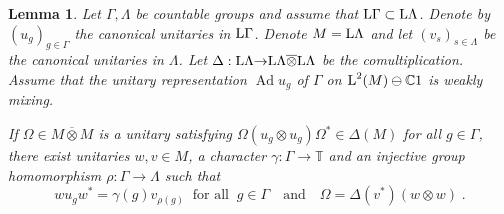 \documentclass[a4paper,11pt]{amsart}
\numberwithin{equation}{section}
\newtheorem{lemma}[definition]{Lemma}
\begin{document}
\begin{lemma} \label{lem.intertwine}
Let $\Gamma,\Lambda$ be countable groups and assume that ${\mathord{\text{\rm L}}} \Gamma \subset {\mathord{\text{\rm L}}} \Lambda$. Denote by $(u_g)_{g \in \Gamma}$ the canonical unitaries in ${\mathord{\text{\rm L}}} \Gamma$. Denote $M = {\mathord{\text{\rm L}}} \Lambda$ and let $(v_s)_{s \in \Lambda}$ be the canonical unitaries in $\Lambda$. Let ${\Delta} : {\mathord{\text{\rm L}}} \Lambda {\rightarrow} {\mathord{\text{\rm L}}} \Lambda {\mathbin{\overline{\otimes}}} {\mathord{\text{\rm L}}} \Lambda$ be the comultiplication. Assume that the unitary representation ${\operatorname{Ad}} u_g$ of $\Gamma$ on ${\mathord{\text{\rm L}}}^2(M) \ominus {\mathbb{C}} 1$ is weakly mixing.

If $\Omega \in M {\mathbin{\overline{\otimes}}} M$ is a unitary satisfying $\Omega (u_g {\otimes} u_g) \Omega^* \in {\Delta}(M)$ for all $g \in \Gamma$, there exist unitaries $w,v \in M$, a character $\gamma : \Gamma {\rightarrow} {\mathbb{T}}$ and an injective group homomorphism $\rho : \Gamma {\rightarrow} \Lambda$ such that
$$w u_g w^* = \gamma(g) v_{\rho(g)} \;\;\text{for all}\;\; g \in \Gamma \quad\text{and}\quad \Omega = {\Delta}(v^*)(w {\otimes} w) \; .$$
\end{lemma}
\end{document}
